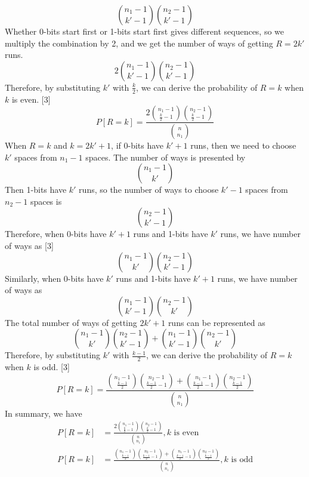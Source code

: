 \documentclass[a4paper,12pt]{article}
\begin{document}
\begin{equation*}
\binom {n_1-1} {k'-1} \binom {n_2-1} {k'-1}
\end{equation*}
Whether 0-bits start first or 1-bits start first gives different sequences, so we multiply the combination by 2, and we get the number of ways of getting $R=2k'$ runs.
\begin{equation*}
  2 \binom {n_1-1} {k'-1} \binom {n_2-1} {k'-1}
\end{equation*}
Therefore, by substituting $k'$ with $\frac{k}{2}$, we can derive the probability of $R=k$  when $k$ is even. [3]
\begin{equation}\label{3.2.2.1}
P[R=k]=\frac{2 \binom {n_1-1} {\frac{k}{2}-1} \binom {n_2-1} {\frac{k}{2}-1}}{\binom {n} {n_1}}
\end{equation}
When $R=k$ and $k=2k'+1$, if 0-bits have $k'+1$ runs, then we need to choose $k'$ spaces from $n_1-1$ spaces. The number of ways is presented by
\begin{equation*}
\binom {n_1-1} {k'}
\end{equation*}
Then 1-bits have $k'$ runs, so the number of ways to choose $k'-1$ spaces from $n_2-1$ spaces is
\begin{equation*}
\binom {n_2-1} {k'-1}
\end{equation*}
Therefore, when 0-bits have $k'+1$ runs and 1-bits have $k'$ runs, we have number of ways as [3]
\begin{equation*}
\binom {n_1-1} {k'} \binom {n_2-1} {k'-1}
\end{equation*}
Similarly, when 0-bits have $k'$ runs and 1-bits have $k'+1$ runs, we have number of ways as
\begin{equation*}
\binom {n_1-1} {k'-1} \binom {n_2-1} {k'}
\end{equation*}
The total number of ways of getting $2k'+1$ runs can be represented as
\begin{equation*}
\binom {n_1-1} {k'} \binom {n_2-1} {k'-1}+\binom {n_1-1} {k'-1} \binom {n_2-1} {k'}
\end{equation*}
Therefore, by substituting $k'$ with $\frac{k-1}{2}$, we can derive the probability of $R=k$  when $k$ is odd. [3]
\begin{equation}\label{3.2.2.2}
P[R=k]=\frac{\binom {n_1-1} {\frac{k-1}{2}} \binom {n_2-1} {\frac{k-1}{2}-1}+\binom {n_1-1} {\frac{k-1}{2}-1} \binom {n_2-1} {\frac{k-1}{2}}}{\binom {n} {n_1}}
\end{equation}
In summary, we have
\begin{equation}\label{as}
\begin{aligned}
P[R=k]&=\frac{2 \binom {n_1-1} {\frac{k}{2}-1} \binom {n_2-1} {\frac{k}{2}-1}}{\binom {n} {n_1}}, k\text{ is even}\\
P[R=k]&=\frac{\binom {n_1-1} {\frac{k-1}{2}} \binom {n_2-1} {\frac{k-1}{2}-1}+\binom {n_1-1} {\frac{k-1}{2}-1} \binom {n_2-1} {\frac{k-1}{2}}}{\binom {n} {n_1}},k\text{ is odd}\\
\end{aligned}
\end{equation}
\end{document}

